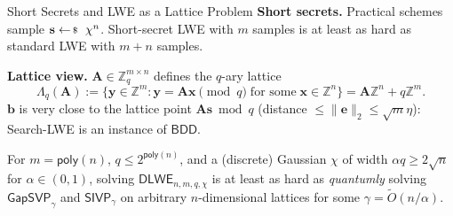 \documentclass{zkdl-presentation-template}
\begin{document}
    \begin{frame}{Short Secrets and LWE as a Lattice Problem}
        \textbf{Short secrets.} Practical schemes sample $\mathbf{s} \leftarrowS \chi^n$. Short-secret LWE with $m$ samples is at least as hard as standard LWE with $m+n$ samples.
        \pause

        \textbf{Lattice view.} $\mathbf{A} \in \mathbb{Z}_q^{m \times n}$ defines the $q$-ary lattice
        \begin{equation*}
            \Lambda_q(\mathbf{A}) := \{\mathbf{y} \in \mathbb{Z}^m: \mathbf{y} = \mathbf{A}\mathbf{x} \pmod{q} \; \text{for some} \; \mathbf{x} \in \mathbb{Z}^n\} = \mathbf{A}\mathbb{Z}^n + q\mathbb{Z}^m.
        \end{equation*}
        $\mathbf{b}$ is very close to the lattice point $\mathbf{A}\mathbf{s} \bmod q$ (distance $\leq \|\mathbf{e}\|_2 \leq \sqrt{m}\eta$): Search-LWE is an instance of $\mathsf{BDD}$.
        \pause

        \begin{theorem}
            For $m = \mathsf{poly}(n)$, $q \leq 2^{\mathsf{poly}(n)}$, and a (discrete) Gaussian $\chi$ of width $\alpha q \geq 2\sqrt{n}$ for $\alpha \in (0,1)$, solving $\mathsf{DLWE}_{n,m,q,\chi}$ is at least as hard as \emph{quantumly} solving $\mathsf{GapSVP}_{\gamma}$ and $\mathsf{SIVP}_{\gamma}$ on arbitrary $n$-dimensional lattices for some $\gamma = \widetilde{O}(n/\alpha)$.
        \end{theorem}
    \end{frame}
\end{document}
